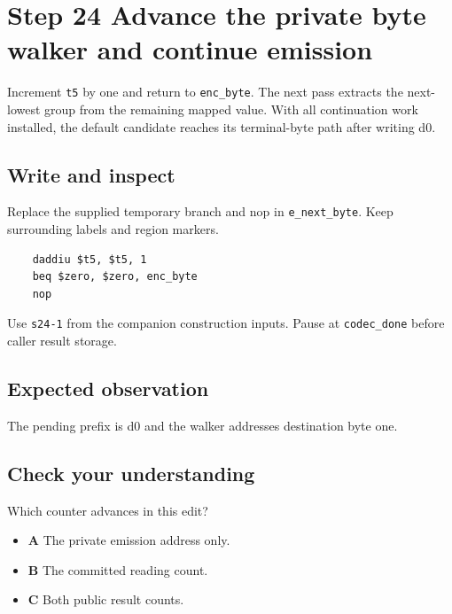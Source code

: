 \section{Step 24 Advance the private byte walker and continue emission}\label{delta-s24}

Increment \texttt{t5} by one and return to \texttt{enc\_byte}. The next pass extracts the next-lowest group from the remaining mapped value. With all continuation work installed, the default candidate reaches its terminal-byte path after writing d0.

\subsection{Write and inspect}
Replace the supplied temporary branch and nop in \texttt{e\_next\_byte}. Keep surrounding labels and region markers.

\begin{verbatim}
    daddiu $t5, $t5, 1
    beq $zero, $zero, enc_byte
    nop
\end{verbatim}
Use \texttt{s24-1} from the companion construction inputs. Pause at \texttt{codec\_done} before caller result storage.

\subsection{Expected observation}
The pending prefix is d0 and the walker addresses destination byte one.

\subsection{Check your understanding}
Which counter advances in this edit?

\begin{itemize}
  \item \textbf{A} The private emission address only.
  \item \textbf{B} The committed reading count.
  \item \textbf{C} Both public result counts.
\end{itemize}
